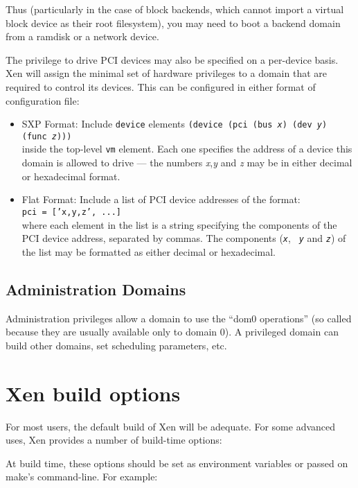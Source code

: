 \documentclass[11pt,twoside,final,openright]{xenstyle}
\begin{document}
{Thus (particularly in the case of block backends, which cannot import
a virtual block device as their root filesystem), you may need to boot
a backend domain from a ramdisk or a network device.

The privilege to drive PCI devices may also be specified on a
per-device basis.  Xen will assign the minimal set of hardware
privileges to a domain that are required to control its devices.  This
can be configured in either format of configuration file:

\begin{itemize}
\item SXP Format:
  Include {\tt device} elements
  {\tt (device (pci (bus {\em x}) (dev {\em y}) (func {\em z}))) } \\
  inside the top-level {\tt vm} element.  Each one specifies the address
  of a device this domain is allowed to drive ---
  the numbers {\em x},{\em y} and {\em z} may be in either decimal or
  hexadecimal format.
\item Flat Format: Include a list of PCI device addresses of the
  format: \\ {\tt pci = ['x,y,z', ...] } \\ where each element in the
  list is a string specifying the components of the PCI device
  address, separated by commas.  The components ({\tt \em x}, {\tt \em
  y} and {\tt \em z}) of the list may be formatted as either decimal
  or hexadecimal.
\end{itemize}

\section{Administration Domains}

Administration privileges allow a domain to use the ``dom0
operations'' (so called because they are usually available only to
domain 0).  A privileged domain can build other domains, set scheduling
parameters, etc.


\chapter{Xen build options}

For most users, the default build of Xen will be adequate.  For some
advanced uses, Xen provides a number of build-time options:

At build time, these options should be set as environment variables or
passed on make's command-line.  For example:

}
\end{document}
